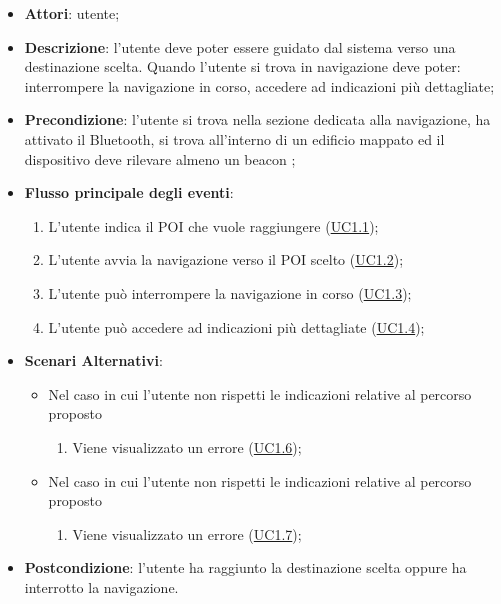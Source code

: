 \documentclass[../AnalisiDeiRequisiti.tex]{subfiles}
\begin{document}
\begin{itemize}
\item \textbf{Attori}: utente;
\item \textbf{Descrizione}: l'utente deve poter essere guidato dal sistema verso una destinazione scelta. Quando l'utente si trova in navigazione deve poter: interrompere la navigazione in corso, accedere ad indicazioni più dettagliate; 
      \item \textbf{Precondizione}: l'utente si trova nella sezione dedicata alla navigazione, ha attivato il Bluetooth, si trova all'interno di un edificio mappato ed il dispositivo deve rilevare almeno un beacon
;

        \item \textbf{Flusso principale degli eventi}:
          \begin{enumerate}
          \item L'utente indica il POI che vuole raggiungere (\hyperlink{UC1.1}{UC1.1});
          \item L'utente avvia la navigazione verso il POI scelto (\hyperlink{UC1.2}{UC1.2});
          \item L'utente può interrompere la navigazione in corso  (\hyperlink{UC1.3}{UC1.3});
          \item L'utente può accedere ad indicazioni più dettagliate  (\hyperlink{UC1.4}{UC1.4});

      \end{enumerate}

    \item \textbf{Scenari Alternativi}:
    	\begin{itemize}
      		\item Nel caso in cui l'utente non rispetti le indicazioni relative al percorso proposto
      		\begin{enumerate}
         		\item Viene visualizzato un errore (\hyperlink{UC1.6}{UC1.6});
      		\end{enumerate}
      		\item Nel caso in cui l'utente non rispetti le indicazioni relative al percorso proposto
      		\begin{enumerate}
         		\item Viene visualizzato un errore (\hyperlink{UC1.7}{UC1.7});
      		\end{enumerate}
      	\end{itemize}
    \item \textbf{Postcondizione}: l'utente ha raggiunto la destinazione scelta oppure ha interrotto la navigazione.
  \end{itemize}
\hypertarget{UC1.1}{}
\end{document}
